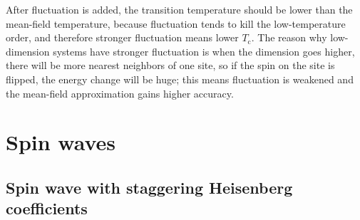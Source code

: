 \documentclass[hyperref, a4paper]{article}
\newcommand*{\Tc}{T_{\text{c}}}
\begin{document}
After fluctuation is added, 
the transition temperature should be lower than the mean-field temperature, 
because fluctuation tends to kill the low-temperature order, 
and therefore stronger fluctuation means lower $\Tc$.
The reason why low-dimension systems have stronger fluctuation 
is when the dimension goes higher, 
there will be more nearest neighbors of one site, 
so if the spin on the site is flipped, 
the energy change will be huge; 
this means fluctuation is weakened 
and the mean-field approximation gains higher accuracy.

\section{Spin waves}

\subsection{Spin wave with staggering Heisenberg coefficients}
\end{document}
